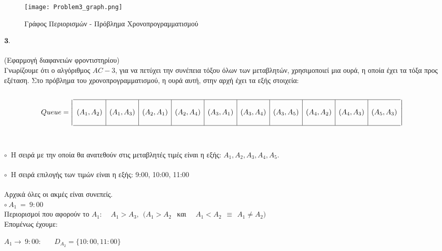 \documentclass[10pt]{article}
\begin{document}
\begin{figure}[H]
    \texttt{[image: Problem3\_graph.png]}\\
    \caption{Γράφος Περιορισμών - Πρόβλημα Χρονοπρογραμματισμού}

\end{figure}  

\vspace{10mm}

\hspace{5mm}$\bf 3. \normalfont$ \\ \\
(Εφαρμογή διαφανειών φροντιστηρίου) \\
Γνωρίζουμε ότι ο αλγόριθμος $AC-3$, για να πετύχει την συνέπεια τόξου όλων των μεταβλητών, χρησιμοποιεί μια ουρά, η οποία έχει τα τόξα προς εξέταση. Στο πρόβλημα του χρονοπρογραμματισμού, η ουρά αυτή, στην αρχή έχει τα εξής στοιχεία:\\ \\
\[ Queue =
\left | 
\begin{array}{l|l|l|l|l|l|l|l|l|l}
 \hline  & & & & & & & & & \\  (A_{1},A_{2}) &
 (A_{1},A_{3}) & 
 (A_{2},A_{1}) &
 (A_{2},A_{4}) &  
 (A_{3},A_{1}) &  
 (A_{3},A_{4}) & 
 (A_{3},A_{5}) & 
 (A_{4},A_{2}) &
 (A_{4},A_{3}) &
 (A_{5},A_{3}) \\
& & & & & & & & & \\  
\hline  
     \end{array} 
\right | \] \\ \\
$\circ \ $ Η σειρά με την οποία θα ανατεθούν στις μεταβλητές τιμές είναι η εξής: $A_{1},A_{2}, A_{3},A_{4},A_{5}.$ \\ \\
$\circ \ $ Η σειρά επιλογής των τιμών είναι η εξής: 9:00, 10:00, 11:00 \\ \\
Αρχικά όλες οι ακμές είναι συνεπείς. \\

$\circ \ A_{1} \ = \ 9:00 $ \\

Περιορισμοί που αφορούν το $A_{1} : \ \ \ \ \ A_{1} > A_{3}, \ \ (A_{1} > A_{2} \ \ $ και \ \ $ A_{1} < A_{2} \ \  \equiv \ \ A_{1} \neq A_{2} )$\\

Επομένως έχουμε: 

$ A_{1} \rightarrow \ 9:00:  \ \ \ \ \ \ \ \ 
D_{A_{2}} = \{ 10:00, 11:00\}$ \\
\end{document}
